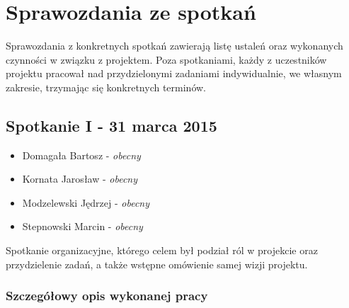 \par{}

\section[Sprawozdania ze spotkań]{Sprawozdania ze spotkań}

\par{Sprawozdania z konkretnych spotkań zawierają listę ustaleń oraz wykonanych czynności w związku z projektem. Poza spotkaniami, każdy z uczestników projektu pracował nad przydzielonymi zadaniami indywidualnie, we własnym zakresie, trzymając się konkretnych terminów.}

\subsection[Spotkanie I - 31 marca 2015]{Spotkanie I - 31 marca 2015}

\begin{itemize}
\item Domagała Bartosz - \textit{obecny}
\item Kornata Jarosław - \textit{obecny}
\item Modzelewski Jędrzej - \textit{obecny}
\item Stepnowski Marcin - \textit{obecny}
\end{itemize}

\par{Spotkanie organizacyjne, którego celem był podział ról w projekcie oraz przydzielenie zadań, a także wstępne omówienie samej wizji projektu.}


\subsubsection*[Szczegółowy opis wykonanej pracy]{Szczegółowy opis wykonanej pracy}

